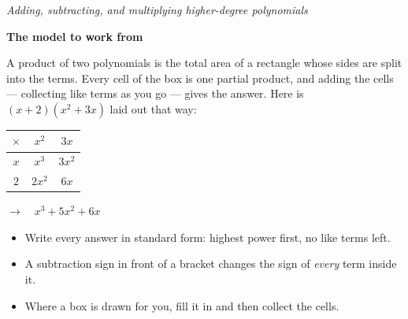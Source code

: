 \documentclass[12pt]{article}
\begin{document}

\begin{center}
{\small\textit{Adding, subtracting, and multiplying higher-degree polynomials}}
\end{center}

\vspace{0.15cm}
\noindent\textbf{The model to work from}

\noindent A product of two polynomials is the total area of a rectangle whose
sides are split into the terms. Every cell of the box is one partial product,
and adding the cells --- collecting like terms as you go --- gives the answer.
Here is $(x + 2)(x^{2} + 3x)$ laid out that way:

\vspace{0.1cm}
\begin{center}
\begin{tabular}{|c|c|c|}
\hline
$\times$   & $x^{2}$   & $3x$   \\ \hline
$x$        & $x^{3}$   & $3x^{2}$ \\ \hline
$2$        & $2x^{2}$  & $6x$   \\ \hline
\end{tabular}
\qquad
$\longrightarrow\quad x^{3} + 5x^{2} + 6x$
\end{center}

\vspace{0.1cm}
\begin{itemize}[leftmargin=0.7cm, itemsep=1pt, topsep=3pt]
  \item Write every answer in standard form: highest power first, no like terms left.
  \item A subtraction sign in front of a bracket changes the sign of \emph{every}
    term inside it.
  \item Where a box is drawn for you, fill it in and then collect the cells.
\end{itemize}

\vspace{0.2cm}



\end{document}
